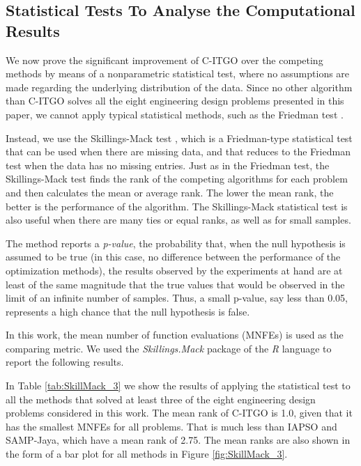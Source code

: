 


\subsection{Statistical Tests To Analyse the Computational Results}

We now prove the significant improvement of C-ITGO over the competing methods by means of a nonparametric statistical test, where no assumptions are made regarding the underlying distribution of the data. Since no other algorithm than C-ITGO solves all the eight engineering design problems presented in this paper, we cannot apply typical statistical methods, such as the Friedman test \citep{Friedman}.

Instead, we use the Skillings-Mack test \citep{Skillings}, which is a Friedman\allowbreak-type statistical test that can be used when there are missing data, and that reduces to the Friedman test when the data has no missing entries. Just as in the Friedman test, the Skillings-Mack test finds the rank of the competing algorithms for each problem and then calculates the mean or average rank. The lower the mean rank, the better is the performance of the algorithm. The Skillings-Mack statistical test is also useful when there are many ties or equal ranks, as well as for small samples.

The method reports a \textit{p-value}, the probability that, when the null hypothesis is assumed to be true (in this case, no difference between the performance of the optimization methods), the results observed by the experiments at hand are at least of the same magnitude that the true values that would be observed in the limit of an infinite number of samples. Thus, a small p-value, say less than 0.05, represents a high chance that the null hypothesis is false.

In this work, the mean number of function evaluations (MNFEs) is used as the comparing metric. We used the \textit{Skillings.Mack} package \citep{SkillMack} of the \textit{R} language \citep{R} to report the following results.

In Table \ref{tab:SkillMack_3} we show the results of applying the statistical test to all the methods that solved at least three of the eight engineering design problems considered in this work. The mean rank of C-ITGO is 1.0, given that it has the smallest MNFEs for all problems. That is much less than IAPSO and SAMP-Jaya, which have a mean rank of 2.75. The mean ranks are also shown in the form of a bar plot for all methods in Figure \ref{fig:SkillMack_3}.


